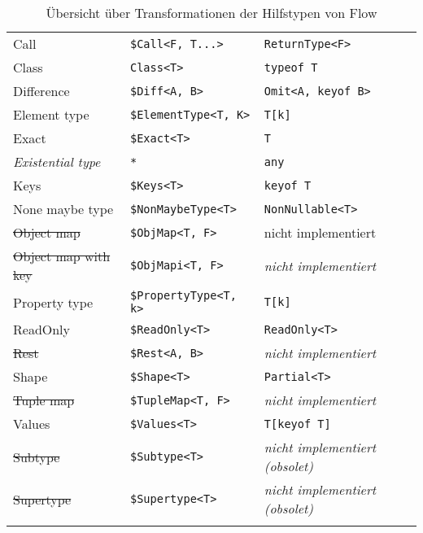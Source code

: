 \begin{footnotesize}
\begin{longtabu} to 
  \midrule
   &  &   \\
  \midrule
  \endhead
  Call                        & \texttt{\$Call<F, T...>}        & \texttt{ReturnType<F>}        \\
  Class                       & \texttt{Class<T>}               & \texttt{typeof T}             \\
  Difference                  & \texttt{\$Diff<A, B>}           & \texttt{Omit<A, keyof B>}     \\
  Element type                & \texttt{\$ElementType<T, K>}    & \texttt{T[k]}                 \\
  Exact                       & \texttt{\$Exact<T>}             & \texttt{T}                    \\
  \textit{Existential type}   & \texttt{*}                      & \texttt{any}                  \\
  Keys                        & \texttt{\$Keys<T>}              & \texttt{keyof T}              \\
  None maybe type             & \texttt{\$NonMaybeType<T>}      & \texttt{NonNullable<T>}       \\
  \sout{Object map}           & \texttt{\$ObjMap<T, F>}         & \textmd{nicht implementiert}  \\
  \sout{Object map with key}  & \texttt{\$ObjMapi<T, F>}        & \textit{nicht implementiert}  \\
  Property type               & \texttt{\$PropertyType<T, k>}   & \texttt{T[k]}                 \\
  ReadOnly                    & \texttt{\$ReadOnly<T>}          & \texttt{ReadOnly<T>}          \\
  \sout{Rest}                 & \texttt{\$Rest<A, B>}           & \textit{nicht implementiert}  \\
  Shape                       & \texttt{\$Shape<T>}             & \texttt{Partial<T>}           \\
  \sout{Tuple map}            & \texttt{\$TupleMap<T, F>}       & \textit{nicht implementiert}  \\
  Values                      & \texttt{\$Values<T>}            & \texttt{T[keyof T]}           \\
  \sout{Subtype}              & \texttt{\$Subtype<T>}           & \textit{nicht implementiert (obsolet)} \\
  \sout{Supertype}            & \texttt{\$Supertype<T>}         & \textit{nicht implementiert (obsolet)} \\
  \midrule
  \caption{Übersicht über Transformationen der Hilfstypen von Flow}
  \label{tab:transformation-utility-types}
\end{longtabu}
\end{footnotesize}
